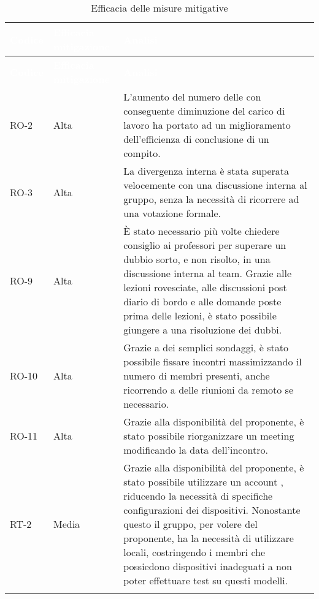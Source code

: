 {
\setlength{\tabcolsep}{10pt}
\renewcommand{\arraystretch}{1.5}
\begin{xltabular}{\textwidth}{| l | l | X |}
    \hline
     \textbf{\textcolor{white}{Codice}} & \textbf{\textcolor{white}{Efficacia mitigazione}} & \textbf{\textcolor{white}{Analisi}} \\
    \hline
    \endfirsthead
    \hline
     \textbf{\textcolor{white}{Codice}} & \textbf{\textcolor{white}{Efficacia mitigazione}} & \textbf{\textcolor{white}{Analisi}} \\
    \hline
    \endhead
    RO-2 & Alta & L'aumento del numero delle  con conseguente diminuzione del carico di lavoro ha portato ad un miglioramento dell'efficienza di conclusione di un compito. \\
    \hline
    RO-3 & Alta & La divergenza interna è stata superata velocemente con una discussione interna al gruppo, senza la necessità di ricorrere ad una votazione formale. \\
    \hline
    RO-9 & Alta & È stato necessario più volte chiedere consiglio ai professori per superare un dubbio sorto, e non risolto, in una discussione interna al team. Grazie alle lezioni rovesciate, alle discussioni post diario di bordo e alle domande poste prima delle lezioni, è stato possibile giungere a una risoluzione dei dubbi. \\
    \hline
    RO-10 & Alta & Grazie a dei semplici sondaggi, è stato possibile fissare incontri massimizzando il numero di membri presenti, anche ricorrendo a delle riunioni da remoto se necessario. \\
    \hline
    RO-11 & Alta & Grazie alla disponibilità del proponente, è stato possibile riorganizzare un meeting modificando la data dell'incontro. \\
    \hline
    RT-2 & Media & Grazie alla disponibilità del proponente, è stato possibile utilizzare un account , riducendo la necessità di specifiche configurazioni dei dispositivi. Nonostante questo il gruppo, per volere del proponente, ha la necessità di utilizzare  locali, costringendo i membri che possiedono dispositivi inadeguati a non poter effettuare test su questi modelli.\\
    \hline
     \caption{Efficacia delle misure mitigative}
    \label{tab:mitigazioni}
\end{xltabular}
}


\newpage